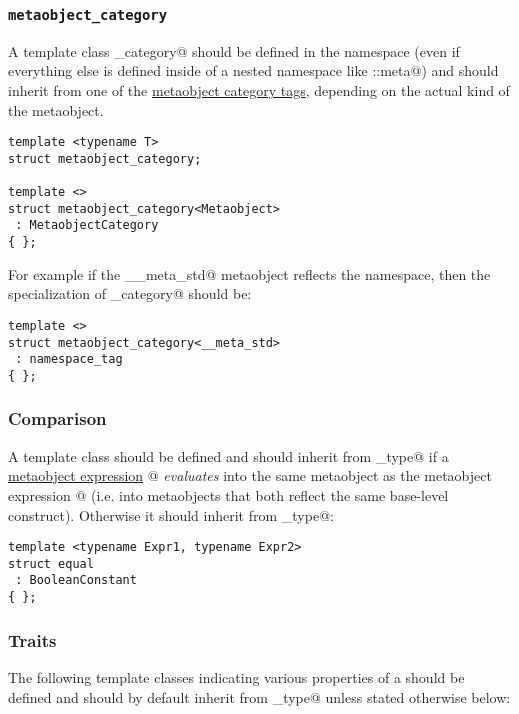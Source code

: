 \subsubsection{\texttt{metaobject\_category}}

A template class \verb@metaobject_category@ should be defined in the \verb@std@ namespace
(even if everything else is defined inside of a nested namespace like \verb@std::meta@)
and should inherit from
one of the \hyperref[metaobject-category-tags]{metaobject category tags}, depending on
the actual kind of the metaobject.

\begin{verbatim}
template <typename T>
struct metaobject_category;

template <>
struct metaobject_category<Metaobject>
 : MetaobjectCategory
{ };
\end{verbatim}

For example if the \verb@__meta_std@ metaobject reflects the \verb@std@ namespace,
then the specialization of \verb@metaobject_category@ should be:

\begin{verbatim}
template <>
struct metaobject_category<__meta_std>
 : namespace_tag
{ };
\end{verbatim}

\subsubsection{Comparison}

A template class \verb@equal@ should be defined and should inherit from \verb@true_type@
if a \hyperref[section-Library]{metaobject expression} @ {\em evaluates} into
the same metaobject as the metaobject expression @ (i.e. into metaobjects
that both reflect the same base-level construct). Otherwise it should inherit from
\verb@false_type@:

\begin{verbatim}
template <typename Expr1, typename Expr2>
struct equal
 : BooleanConstant
{ };
\end{verbatim}

\subsubsection{Traits}

The following template classes indicating various properties of a 
should be defined and should by default inherit from \verb@false_type@ unless stated
otherwise below:

